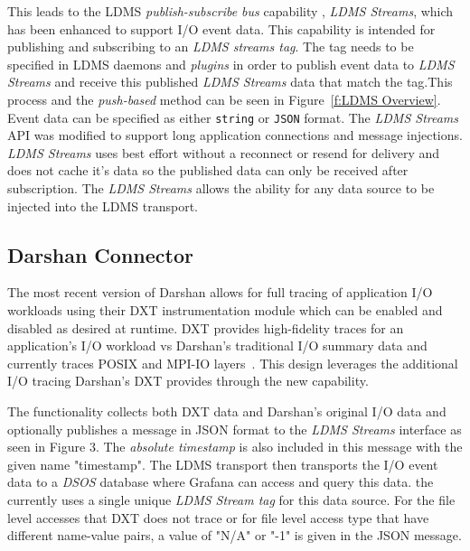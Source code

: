 This leads to the LDMS \emph{publish-subscribe bus} capability , \emph{LDMS Streams}, which has been enhanced to support I/O event data. This capability is intended for publishing and subscribing to an \emph{LDMS streams tag}. The tag needs to be specified in LDMS daemons and \emph{plugins} in order to publish event data to \emph{LDMS Streams} and receive this published \emph{LDMS Streams} data that match the tag.This process and the \emph{push-based} method can be seen in Figure~\ref{f:LDMS Overview}. Event data can be specified as either \texttt{string} or \texttt{JSON} format. The \emph{LDMS Streams} API was modified to support long application connections and message injections. \emph{LDMS Streams} uses best effort without a reconnect or resend for delivery and does not cache it's data so the published data can only be received after subscription. The \emph{LDMS Streams} allows the ability for any data source to be injected into the LDMS transport.

\subsection{Darshan Connector}

The most recent version of Darshan allows for full tracing of application I/O workloads using their DXT instrumentation module which can be enabled and disabled as desired at runtime. DXT provides high-fidelity traces for an application's I/O workload vs Darshan's traditional I/O summary data and currently traces POSIX and MPI-IO layers~\cite{darshan-runtime}. This design leverages the additional I/O tracing Darshan's DXT provides through the new \connector capability.


The \connector functionality collects both DXT data and Darshan's original I/O data and optionally publishes a message in JSON format to the \emph{LDMS Streams} interface as seen in Figure 3. The \emph{absolute timestamp} is also included in this message with the given name "timestamp". The LDMS transport then transports the I/O event data to a \emph{DSOS} database where Grafana can access and query this data. the \connector currently uses a single unique \emph{LDMS Stream tag} for this data source. For the file level accesses that DXT does not trace or for file level access type that have different name-value pairs, a value of "N/A" or "-1" is given in the JSON message. 

